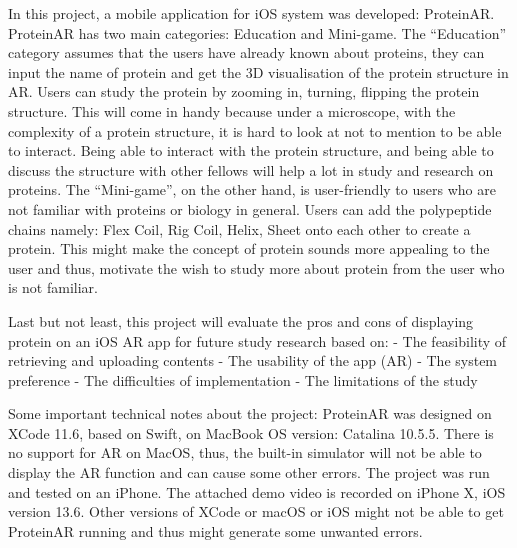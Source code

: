 In this project, a mobile application for iOS system was developed: ProteinAR. ProteinAR has two main categories: Education and Mini-game. 
The “Education” category assumes that the users have already known about proteins, they can input the name of protein and get the 3D visualisation of the protein structure in AR. Users can study the protein by zooming in, turning, flipping the protein structure. This will come in handy because under a microscope, with the complexity of a protein structure, it is hard to look at not to mention to be able to interact. Being able to interact with the protein structure, and being able to discuss the structure with other fellows will help a lot in study and research on proteins. 
The “Mini-game”, on the other hand, is user-friendly to users who are not familiar with proteins or biology in general. Users can add the polypeptide chains namely: Flex Coil, Rig Coil, Helix, Sheet onto each other to create a protein. This might make the concept of protein sounds more appealing to the user and thus, motivate the wish to study more about protein from the user who is not familiar. 

Last but not least, this project will evaluate the pros and cons of displaying protein on an iOS AR app for future study research based on:
- The feasibility of retrieving and uploading contents
- The usability of the app (AR)
- The system preference 
- The difficulties of implementation
- The limitations of the study

Some important technical notes about the project:
ProteinAR was designed on XCode 11.6, based on Swift, on MacBook OS version: Catalina 10.5.5. There is no support for AR on MacOS, thus, the built-in simulator will not be able to display the AR function and can cause some other errors. The project was run and tested on an iPhone. The attached demo video is recorded on iPhone X, iOS version 13.6. Other versions of XCode or macOS or iOS might not be able to get ProteinAR running and thus might generate some unwanted errors. 

